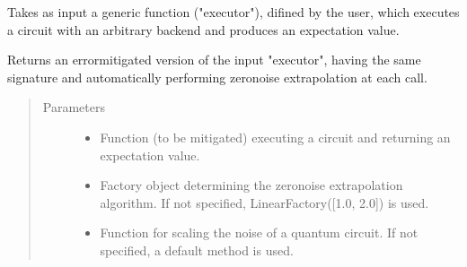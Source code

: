 \documentclass[letterpaper,10pt,english]{sphinxmanual}
\begin{document}
\begin{fulllineitems}
\label{\detokenize{index:mitiq.zne.mitigate_executor}}
Takes as input a generic function ("executor"), difined by the user, which executes a circuit
with an arbitrary backend and produces an expectation value.

Returns an error\sphinxhyphen{}mitigated version of the input "executor", having the same signature and
automatically performing zero\sphinxhyphen{}noise extrapolation at each call.
\begin{quote}\begin{description}
\item[{Parameters}] \leavevmode\begin{itemize}
\item {} 
 \sphinxhyphen{}\sphinxhyphen{} Function (to be mitigated) executing a circuit and returning an expectation value.

\item {} 
 \sphinxhyphen{}\sphinxhyphen{} Factory object determining the zero\sphinxhyphen{}noise extrapolation algorithm.
If not specified, LinearFactory({[}1.0, 2.0{]}) is used.

\item {} 
 \sphinxhyphen{}\sphinxhyphen{} Function for scaling the noise of a quantum circuit.
If not specified, a default method is used.

\end{itemize}

\end{description}\end{quote}

\end{fulllineitems}

\end{document}
